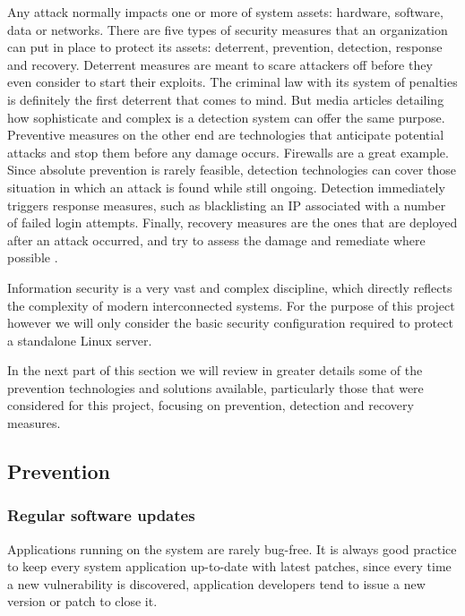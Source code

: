 Any attack normally impacts one or more of system assets: hardware, software,
data or networks. There are five types of security
measures that an organization can put in place to protect its assets:
deterrent, prevention, detection, response and recovery. Deterrent measures are
meant to scare attackers off before they even consider to start their exploits.
The criminal law with its system of penalties is definitely the first deterrent
that comes to mind. But media articles detailing how sophisticate and complex is
a detection system can offer the same purpose. Preventive measures on the other
end are technologies that anticipate potential attacks and stop them before any
damage occurs. Firewalls are a great example. Since absolute prevention
is rarely feasible, detection technologies can cover those situation in
which an attack is found while still ongoing. Detection immediately
triggers response measures, such as blacklisting an IP associated with a
number of failed login attempts. Finally, recovery measures are the ones that
are deployed after an attack occurred, and try to assess the damage and
remediate where possible \cite{BL04}.

Information security is a very vast and complex discipline, which
directly reflects the complexity of modern interconnected systems. For the
purpose of this project however we will only consider the basic security
configuration required to protect a standalone Linux server.

In the next part of this section we will review in greater details some of the
prevention technologies and solutions available, particularly those that were
considered for this project, focusing on prevention, detection and
recovery measures.

\subsection{Prevention}

\subsubsection{Regular software updates}
Applications running on the system are rarely bug-free. It is always good
practice to keep every system application up-to-date with latest patches, since
every time a new vulnerability is discovered, application developers tend
to issue a new version or patch to close it.

